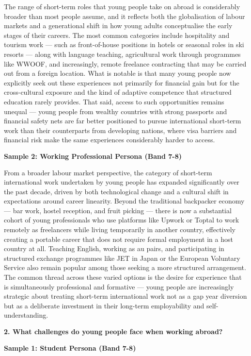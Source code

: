 The range of short-term roles that young people take on abroad is considerably broader than most people assume, and it reflects both the globalisation of labour markets and a generational shift in how young adults conceptualise the early stages of their careers. The most common categories include hospitality and tourism work — such as front-of-house positions in hotels or seasonal roles in ski resorts — along with language teaching, agricultural work through programmes like WWOOF, and increasingly, remote freelance contracting that may be carried out from a foreign location. What is notable is that many young people now explicitly seek out these experiences not primarily for financial gain but for the cross-cultural exposure and the kind of adaptive competence that structured education rarely provides. That said, access to such opportunities remains unequal — young people from wealthy countries with strong passports and financial safety nets are far better positioned to pursue international short-term work than their counterparts from developing nations, where visa barriers and financial risk make the same experiences considerably harder to access.

\textbf{Sample 2: Working Professional Persona (Band 7-8)}

From a broader labour market perspective, the category of short-term international work undertaken by young people has expanded significantly over the past decade, driven by both technological change and a cultural shift in expectations around career linearity. Beyond the traditional backpacker economy — bar work, hostel reception, and fruit picking — there is now a substantial cohort of young professionals who use platforms like Upwork or Toptal to work remotely as freelancers while living temporarily in another country, effectively creating a portable career that does not require formal employment in a host country at all. Teaching English, working as au pairs, and participating in structured exchange programmes like JET in Japan or the European Voluntary Service also remain popular among those seeking a more structured arrangement. The common thread across these varied options is the desire for experience that is simultaneously professional and formative — young people are increasingly strategic about treating short-term international work not as a gap year diversion but as a deliberate investment in their long-term employability and self-understanding.

\separator

\begin{ieltsquestion}
\textbf{2. What challenges do young people face when working abroad?}
\end{ieltsquestion}
\textbf{Sample 1: Student Persona (Band 7-8)}

